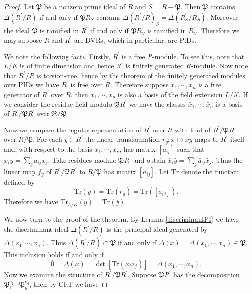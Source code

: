 \begin{proof}
Let $\mathfrak{P}$ be a nonzero prime ideal of $R$ and $S=R-\mathfrak{P}$. Then $\mathfrak{P}$ contains $\Delta(R^\prime/R)$ if and only if $\mathfrak{P}R_S$ contains $\Delta(R^\prime/R)_S=\Delta(R_S^\prime/R_S)$. Moreover the ideal $\mathfrak{P}$ is ramified in $R^\prime$ if and only if $\mathfrak{P}R_S$ is ramified in $R_S^\prime$. Therefore we may suppose $R$ and $R^\prime$ are DVRs, which in particular, are PIDs.\par
We note the following facts. Firstly, $R^\prime$ is a free $R$-module. To see this, note that $L/K$ is of finite dimension and hence $R^\prime$ is finitely generated $R$-module. Now note that $R^\prime/R$ is torsion-free, hence by the theorem of the finitely generated modules over PIDs we have $R^\prime$ is free over $R$. Therefore suppose $x_1,\cdots,x_n$ is a free generator of $R^\prime$ over $R$, then $x_1,\cdots,x_n$ is also a basis of the field extension $L/K$. If we consider the residue field modulo $\mathfrak{P}R^\prime$ we have the classes $\bar{x}_1,\cdots,\bar{x}_n$ is a basis of $R^\prime/\mathfrak{P}R^\prime$ over $\mathfrak{R}/\mathfrak{P}$.\par
Now we compare the regular representation of $R^\prime$ over $R$ with that of $R^\prime/\mathfrak{P}R^\prime$ over $R/\mathfrak{P}$. For each $y\in R^\prime$ the linear transformation $r_y:x\mapsto xy$ maps to $R^\prime$ itself and, with respect to the basis $x_1,\cdots,x_n$, has matrix $[a_{ij}]$ such that $x_iy=\sum_ja_{ij}x_j$. Take residues modulo $\mathfrak{P}R^\prime$ and obtain $\bar{x}_i\bar{y}=\sum_j\bar{a}_{ij}\bar{x}_j$. Thus the linear map $f_{\bar{y}}$ of $R^\prime/\mathfrak{P}R^\prime$ to $R/\mathfrak{P}$ has matrix $[\bar{a}_{ij}]$. Let $\mathrm{Tr}$ denote the function defined by 
$$
\mathrm{Tr}\left( \bar{y} \right) =\mathrm{Tr}\left( r_{\bar{y}} \right) =\mathrm{Tr}\left( \left[ \bar{a}_{ij} \right] \right) .
$$
Therefore we have $\overline{\mathrm{Tr}_{L/K}(y)}=\mathrm{Tr}(\bar{y})$.\par
We now turn to the proof of the theorem. By Lemma \ref{discriminantPI} we have the discriminant ideal $\Delta(R^\prime/R)$ is the principal ideal generated by $\Delta(x_1,\cdots,x_n)$. Thus $\Delta(R^\prime/R)\subset\mathfrak{P}$ if and only if $\Delta(x)=\Delta(x_1,\cdots,x_n)\in\mathfrak{P}$. This inclusion holds if and only if 
$$
\bar{0}=\overline{\Delta \left( x \right) }=\det \left[ \mathrm{Tr}\left( \bar{x}_i\bar{x}_j \right) \right] =\Delta \left( \bar{x}_1,\cdots ,\bar{x}_n \right) .
$$
Now we examine the structure of $R^\prime/\mathfrak{P}R^\prime$. Suppose $\mathfrak{P}R^\prime$ has the decomposition $\mathfrak{P}_1^{e_1}\cdots\mathfrak{P}_g^{e_g}$, then by CRT we have 

\end{proof}
